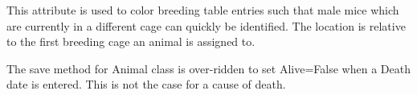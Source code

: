 \documentclass[letterpaper,10pt,english]{sphinxmanual}
\begin{document}
\begin{fulllineitems}
\begin{fulllineitems}
This attribute is used to color breeding table entries such that male mice which are currently in a different cage can quickly be identified.
The location is relative to the first breeding cage an animal is assigned to.

\end{fulllineitems}


\begin{fulllineitems}
\label{animals:mousedb.animal.models.Animal.save}
The save method for Animal class is over-ridden to set Alive=False when a Death date is entered.  This is not the case for a cause of death.

\end{fulllineitems}


\end{fulllineitems}

\end{document}
